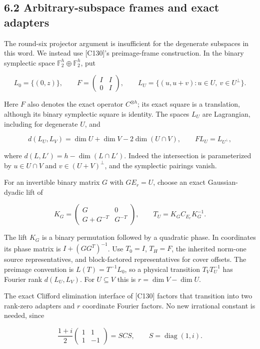 \documentclass[
  11pt,
]{article}
\begin{document}
\subsection{6.2 Arbitrary-subspace frames and exact
adapters}\label{arbitrary-subspace-frames-and-exact-adapters}

The round-six projector argument is insufficient for the degenerate
subspaces in this word. We instead use {[}C130{]}'s preimage-frame
construction. In the binary symplectic space
\(\mathbb F_2^h\oplus\mathbb F_2^h\), put

\[
L_0=\{(0,z)\},\qquad
F=\begin{pmatrix}I&I\\0&I\end{pmatrix},\qquad
L_U=\{(u,u+v):u\in U,\ v\in U^\perp\}.
\]

Here \(F\) also denotes the exact operator \(C^{\otimes h}\); its exact
square is a translation, although its binary symplectic square is
identity. The spaces \(L_U\) are Lagrangian, including for degenerate
\(U\), and

\[
d(L_U,L_V)=\dim U+\dim V-2\dim(U\cap V),\qquad
FL_U=L_{U^\perp},
\tag{6.2}
\]

where \(d(L,L')=h-\dim(L\cap L')\). Indeed the intersection is
parameterized by \(u\in U\cap V\) and \(v\in(U+V)^\perp\), and the
symplectic pairings vanish.

For an invertible binary matrix \(G\) with \(GE_r=U\), choose an exact
Gaussian-dyadic lift of

\[
K_G=\begin{pmatrix}G&0\\G+G^{-T}&G^{-T}\end{pmatrix},
\qquad T_U=K_G C_{E_r}K_G^{-1}.
\]

The lift \(K_G\) is a binary permutation followed by a quadratic phase.
In coordinates its phase matrix is \(I+(GG^T)^{-1}\). Use \(T_0=I\),
\(T_H=F\), the inherited norm-one source representatives, and
block-factored representatives for cover offsets. The preimage
convention is \(L(T)=T^{-1}L_0\), so a physical transition
\(T_VT_U^{-1}\) has Fourier rank \(d(L_U,L_V)\). For \(U\subseteq V\)
this is \(r=\dim V-\dim U\).

The exact Clifford elimination interface of {[}C130{]} factors that
transition into two rank-zero adapters and \(r\) coordinate Fourier
factors. No new irrational constant is needed, since

\[
\frac{1+i}{2}\begin{pmatrix}1&1\\1&-1\end{pmatrix}
=SCS,\qquad S=\operatorname{diag}(1,i).
\]
\end{document}
